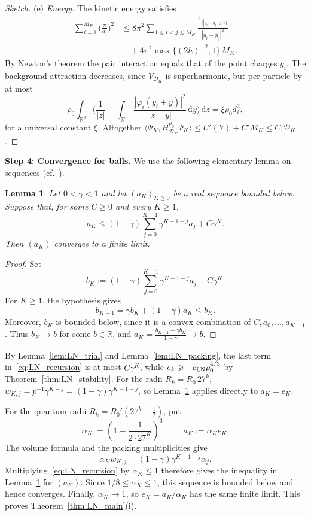 \documentclass[final,reqno]{amsart}
\newtheorem{lemma}[theorem]{Lemma}
\theoremstyle{remark}
\theoremstyle{definition}
\renewcommand{\le}{\leqslant}
\renewcommand{\ge}{\geqslant}
\newcommand{\RR}{\mathbb{R}}
\newcommand{\iden}{\mathbb{1}}
\begin{document}
\begin{proof}[Sketch]
(e) \emph{Energy.} The kinetic energy satisfies
\begin{align*}
\sum_{i=1}^{M_K}\Big(\frac{\pi}{d_i}\Big)^2
&\le8\pi^2\sum_{1\le i<j\le M_K}\frac{\iden_{\{|y_i-y_j|\le1\}}}{|y_i-y_j|^2}\\
&\quad+4\pi^2\max\{(2h)^{-2},1\}\,M_K.
\end{align*}
By Newton's theorem the pair interaction equals that of the point charges $y_i$. The background attraction decreases, since $V_{\mathcal D_K}$ is superharmonic, but per particle by at most
\[
\rho_0\int_{\RR^3}\Big(\frac{1}{|z|}-\int_{\RR^3}\frac{|\varphi_i(y_i+y)|^2}{|z-y|}\,\mathrm{d}y\Big)\,\mathrm{d}z=\xi\rho_0d_i^2,
\]
for a universal constant $\xi$. Altogether $\langle\Psi_K,H^{\rho_0}_{\mathcal D_K}\Psi_K\rangle\le U'(Y)+C'M_K\le C|\mathcal D_K|$.
\end{proof}

\noindent\textbf{Step 4: Convergence for balls.} We use the following elementary lemma on sequences (cf.~\cite[Sec.~IV.D]{lieb1972constitution}).

\begin{lemma}\label{lem:LN_sequences}
Let $0<\gamma<1$ and let $(a_K)_{K\ge0}$ be a real sequence bounded below. Suppose that, for some $C\ge0$ and every $K\ge1$,
\[
a_K\le(1-\gamma)\sum_{j=0}^{K-1}\gamma^{K-1-j}a_j+C\gamma^K.
\]
Then $(a_K)$ converges to a finite limit.
\end{lemma}

\begin{proof}
Set
\[
b_K:=(1-\gamma)\sum_{j=0}^{K-1}\gamma^{K-1-j}a_j+C\gamma^K.
\]
For $K\ge1$, the hypothesis gives
\[
b_{K+1}=\gamma b_K+(1-\gamma)a_K\le b_K.
\]
Moreover, $b_K$ is bounded below, since it is a convex combination of $C,a_0,\ldots,a_{K-1}$. Thus $b_K\to b$ for some $b\in\RR$, and
$a_K=\frac{b_{K+1}-\gamma b_K}{1-\gamma}\to b$.
\end{proof}

By Lemma~\ref{lem:LN_trial} and Lemma~\ref{lem:LN_packing}, the last term in~\eqref{eq:LN_recursion} is at most $C\gamma^K$, while $e_k\ge-c_{\rm LN}\rho_0^{4/3}$ by Theorem~\ref{thm:LN_stability}. For the radii $R_k=R_0\,27^k$, $w_{K,j}=p^{-1}\gamma^{K-j}=(1-\gamma)\gamma^{K-1-j}$, so Lemma~\ref{lem:LN_sequences} applies directly to $a_K=e_K$.

For the quantum radii $R_k=R_0'(27^k-\frac12)$, put
\[
\alpha_K:=\left(1-\frac{1}{2\cdot27^K}\right)^3,
\qquad a_K:=\alpha_K e_K.
\]
The volume formula and the packing multiplicities give
\[
\alpha_K w_{K,j}=(1-\gamma)\gamma^{K-1-j}\alpha_j.
\]
Multiplying~\eqref{eq:LN_recursion} by $\alpha_K\le1$ therefore gives the inequality in Lemma~\ref{lem:LN_sequences} for $(a_K)$. Since $1/8\le\alpha_K\le1$, this sequence is bounded below and hence converges. Finally, $\alpha_K\to1$, so $e_K=a_K/\alpha_K$ has the same finite limit. This proves Theorem~\ref{thm:LN_main}(i).
\end{document}

